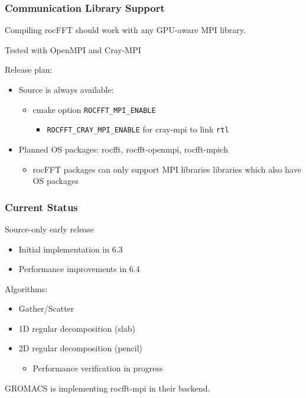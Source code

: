\documentclass[10pt,aspectratio=169]{beamer}
\begin{document}
\begin{frame}
  \frametitle{Communication Library Support}

  Compiling rocFFT should work with any GPU-aware MPI library.

  \medskip
  
  Tested with OpenMPI and Cray-MPI

  \bigskip
  
  Release plan:
  \begin{itemize}
  \item Source is always available:
    \begin{itemize}
    \item cmake option \lstinline{ROCFFT_MPI_ENABLE}
      \begin{itemize}
        \item \lstinline{ROCFFT_CRAY_MPI_ENABLE} for cray-mpi to link
          \lstinline{rtl}
      \end{itemize}
    \end{itemize}
  \item Planned OS packages: rocfft, rocfft-openmpi, rocfft-mpich
    \begin{itemize}
    \item rocFFT packages can only support MPI libraries libraries
      which also have OS packages
    \end{itemize}
  \end{itemize}
  \medskip

  
\end{frame}

\begin{frame}
  \frametitle{Current Status}

  \begin{center}
    Source-only early release
  \end{center}
  \begin{itemize}
  \item Initial implementation in 6.3
  \item Performance improvements in 6.4
  \end{itemize}

  
  \bigskip
  
  Algorithms:
  \begin{itemize}
  \item Gather/Scatter
  \item 1D regular decomposition (slab)
  \item 2D regular decomposition (pencil)
    \begin{itemize}
    \item Performance verification in progress
    \end{itemize}
  \end{itemize}

  \bigskip
  
  GROMACS is implementing rocfft-mpi in their backend.
  
\end{frame}
  
\end{document}
